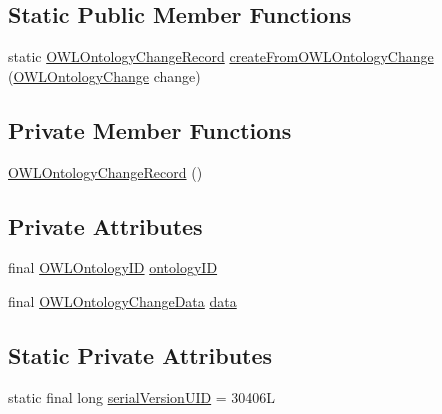 \subsection*{Static Public Member Functions}
\begin{DoxyCompactItemize}
\item 
static \hyperlink{classorg_1_1semanticweb_1_1owlapi_1_1change_1_1_o_w_l_ontology_change_record}{O\-W\-L\-Ontology\-Change\-Record} \hyperlink{classorg_1_1semanticweb_1_1owlapi_1_1change_1_1_o_w_l_ontology_change_record_abbe024a1658fdd50e989cb0dc31fc39c}{create\-From\-O\-W\-L\-Ontology\-Change} (\hyperlink{classorg_1_1semanticweb_1_1owlapi_1_1model_1_1_o_w_l_ontology_change}{O\-W\-L\-Ontology\-Change} change)
\end{DoxyCompactItemize}
\subsection*{Private Member Functions}
\begin{DoxyCompactItemize}
\item 
\hyperlink{classorg_1_1semanticweb_1_1owlapi_1_1change_1_1_o_w_l_ontology_change_record_a64472e2129a0cdfec5024bba73d4a35a}{O\-W\-L\-Ontology\-Change\-Record} ()
\end{DoxyCompactItemize}
\subsection*{Private Attributes}
\begin{DoxyCompactItemize}
\item 
final \hyperlink{classorg_1_1semanticweb_1_1owlapi_1_1model_1_1_o_w_l_ontology_i_d}{O\-W\-L\-Ontology\-I\-D} \hyperlink{classorg_1_1semanticweb_1_1owlapi_1_1change_1_1_o_w_l_ontology_change_record_a266aa672db07998a4f2a42841693290b}{ontology\-I\-D}
\item 
final \hyperlink{classorg_1_1semanticweb_1_1owlapi_1_1change_1_1_o_w_l_ontology_change_data}{O\-W\-L\-Ontology\-Change\-Data} \hyperlink{classorg_1_1semanticweb_1_1owlapi_1_1change_1_1_o_w_l_ontology_change_record_ad4672080c310df7689109cebcf66ed10}{data}
\end{DoxyCompactItemize}
\subsection*{Static Private Attributes}
\begin{DoxyCompactItemize}
\item 
static final long \hyperlink{classorg_1_1semanticweb_1_1owlapi_1_1change_1_1_o_w_l_ontology_change_record_a69f87f9c0ff9ca7e99ede6deb957ff7e}{serial\-Version\-U\-I\-D} = 30406\-L
\end{DoxyCompactItemize}


